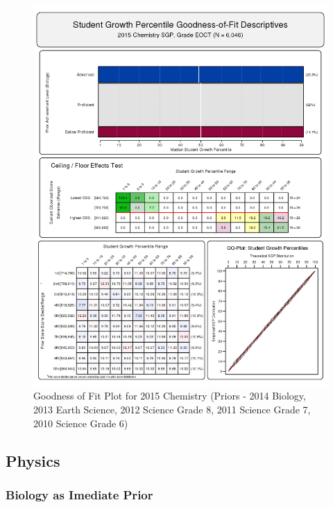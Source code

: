 \documentclass[12pt]{article}
\begin{document}
\begin{figure}[htbp]
\centering
\includegraphics{../img/Goodness_of_Fit/CHEMISTRY.2015/2015_CHEMISTRY_EOCT;2014_BIOLOGY_EOCT;2013_EARTH_SCIENCE_EOCT;2012_SCIENCE_8;2011_SCIENCE_7;2010_SCIENCE_6.png}
\caption{Goodness of Fit Plot for 2015 Chemistry (Priors - 2014 Biology,
2013 Earth Science, 2012 Science Grade 8, 2011 Science Grade 7, 2010
Science Grade 6)}
\end{figure}

\clearpage 

\subsection{Physics}\label{physics}

\subsubsection{Biology as Imediate
Prior}\label{biology-as-imediate-prior}
\end{document}

